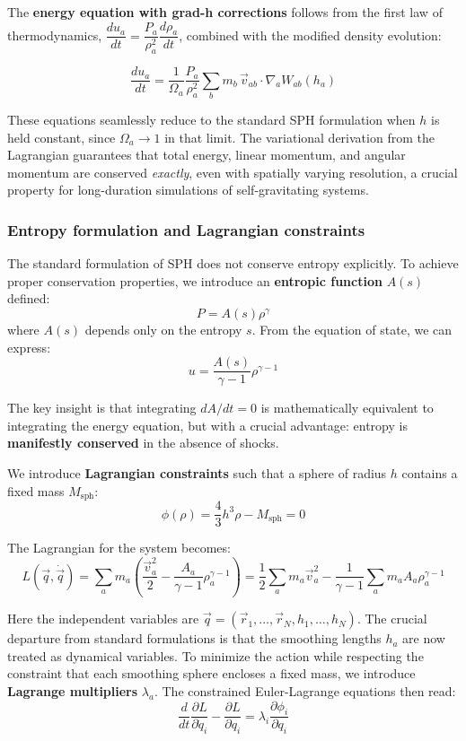\medskip

The \textbf{energy equation with grad-h corrections} follows from the first law of thermodynamics, $\dfrac{du_a}{dt} = \dfrac{P_a}{\rho_a^2} \dfrac{d\rho_a}{dt}$, combined with the modified density evolution:

$$
\boxed{
\dfrac{du_a}{dt} = \dfrac{1}{\Omega_a} \dfrac{P_a}{\rho_a^2} \sum_b m_b \, \vec{v}_{ab} \cdot \nabla_a W_{ab}(h_a)
}
$$

These equations seamlessly reduce to the standard SPH formulation when $h$ is held constant, since $\Omega_a \to 1$ in that limit. The variational derivation from the Lagrangian guarantees that total energy, linear momentum, and angular momentum are conserved \emph{exactly}, even with spatially varying resolution, a crucial property for long-duration simulations of self-gravitating systems.

\subsubsection{Entropy formulation and Lagrangian constraints}

The standard formulation of SPH does not conserve entropy explicitly. To achieve proper conservation properties, we introduce an \textbf{entropic function} $A(s)$ defined:
$$
P = A(s) \rho^\gamma
$$
where $A(s)$ depends only on the entropy $s$. From the equation of state, we can express:
$$
u = \dfrac{A(s)}{\gamma - 1} \rho^{\gamma - 1}
$$

The key insight is that integrating $dA/dt = 0$ is mathematically equivalent to integrating the energy equation, but with a crucial advantage: entropy is \textbf{manifestly conserved} in the absence of shocks.

We introduce \textbf{Lagrangian constraints} such that a sphere of radius $h$ contains a fixed mass $M_{\text{sph}}$:
$$
\phi(\rho) = \dfrac{4}{3} h^3 \rho - M_{\text{sph}} = 0
$$

The Lagrangian for the system becomes:
$$
L(\vec{q}, \dot{\vec{q}}) = \sum_a m_a \left( \dfrac{\vec{v}_a^2}{2} - \dfrac{A_a}{\gamma - 1} \rho_a^{\gamma - 1} \right)
=
\dfrac 12 \sum_a m_a \vec{v}_a^2 - \dfrac{1}{\gamma - 1} \sum_a m_a A_a \rho_a^{\gamma - 1}
$$

Here the independent variables are $\vec{q} = (\vec{r}_1, \ldots, \vec{r}_N, h_1, \ldots, h_N)$. The crucial departure from standard formulations is that the smoothing lengths $h_a$ are now treated as dynamical variables.
To minimize the action while respecting the constraint that each smoothing sphere encloses a fixed mass, we introduce \textbf{Lagrange multipliers} $\lambda_a$. The constrained Euler-Lagrange equations then read:
$$
\dfrac{d}{dt} \dfrac{\partial L}{\partial \dot{q}_i} - \dfrac{\partial L}{\partial q_i} = \lambda_i \dfrac{\partial \phi_i}{\partial q_i}
$$

